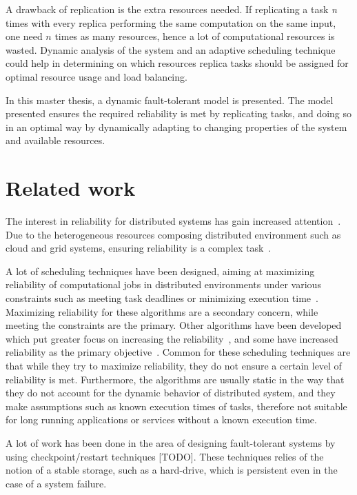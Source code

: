 \documentclass{cslthse-msc}
\begin{document}
A drawback of replication is the extra resources needed. If replicating a task \emph{n} times with every replica performing the same computation on the same input, one need $n$ times as many resources, hence a lot of computational resources is wasted. Dynamic analysis of the system and an adaptive scheduling technique could help in determining on which resources replica tasks should be assigned for optimal resource usage and load balancing.

In this master thesis, a dynamic fault-tolerant model is presented. The model presented ensures the required reliability is met by replicating tasks, and doing so in an optimal way by dynamically adapting to changing properties of the system and available resources.

\section{Related work} \label{sec:introduction_related_work}
The interest in reliability for distributed systems has gain increased attention~\cite{replicationManagement}. Due to the heterogeneous resources composing distributed environment such as cloud and grid systems, ensuring reliability is a complex task~\cite{cloudServiceRel, surveyReliabilityDistr}.

A lot of scheduling techniques have been designed, aiming at maximizing reliability of computational jobs in distributed environments under various constraints such as meeting task deadlines or minimizing execution time~\cite{algoOptTimeMaxRel, optTaskAllocationForMaxRel, taskAllocation, taskAllocationSwarm, algoMaxRelEndToEndConstraint, algoMinExTime, schedReplicas}. Maximizing reliability for these algorithms are a secondary concern, while meeting the constraints are the primary. Other algorithms have been developed which put greater focus on increasing the reliability~\cite{optResourceAllMaxPerformance, matchSchedAlgoMinFailure}, and some have increased reliability as the primary objective~\cite{safetyRelTaskAllocation, improvedTaskAllMaxRel}. Common for these scheduling techniques are that while they try to maximize reliability, they do not ensure a certain level of reliability is met. Furthermore, the algorithms are usually static in the way that they do not account for the dynamic behavior of distributed system, and they make assumptions such as known execution times of tasks, therefore not suitable for long running applications or services without a known execution time.

A lot of work has been done in the area of designing fault-tolerant systems by using checkpoint/restart techniques [TODO]. %
These techniques relies of the notion of a stable storage, such as a hard-drive, which is persistent even in the case of a system failure.
\end{document}
